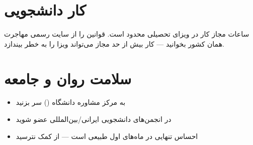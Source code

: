 \section{کار دانشجویی}

\begin{tipbox}
  ساعات مجاز کار در ویزای تحصیلی محدود است.
  قوانین را از سایت رسمی مهاجرت همان کشور بخوانید —
  کار بیش از حد مجاز می‌تواند ویزا را به خطر بیندازد.
\end{tipbox}

\section{سلامت روان و جامعه}

\begin{itemize}
  \item به مرکز مشاوره دانشگاه () سر بزنید
  \item در انجمن‌های دانشجویی ایرانی/بین‌المللی عضو شوید
  \item احساس تنهایی در ماه‌های اول طبیعی است — از کمک نترسید
\end{itemize}
